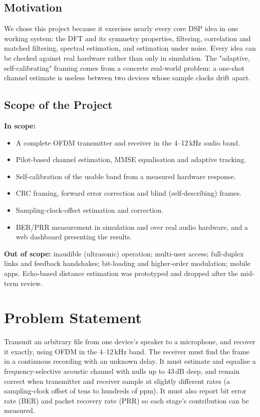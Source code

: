 \documentclass[11pt,a4paper]{report}
\begin{document}
\section{Motivation}
We chose this project because it exercises nearly every core DSP idea in one working
system: the DFT and its symmetry properties, filtering, correlation and matched
filtering, spectral estimation, and estimation under noise. Every idea can be
checked against real hardware rather than only in simulation. The "adaptive,
self-calibrating" framing comes from a concrete real-world problem: a one-shot
channel estimate is useless between two devices whose sample clocks drift apart.

\section{Scope of the Project}
\textbf{In scope:}
\begin{itemize}
    \item A complete OFDM transmitter and receiver in the 4--12\,kHz audio band.
    \item Pilot-based channel estimation, MMSE equalisation and adaptive tracking.
    \item Self-calibration of the usable band from a measured hardware response.
    \item CRC framing, forward error correction and blind (self-describing) frames.
    \item Sampling-clock-offset estimation and correction.
    \item BER/PRR measurement in simulation and over real audio hardware, and a web
    dashboard presenting the results.
\end{itemize}
\textbf{Out of scope:} inaudible (ultrasonic) operation; multi-user access;
full-duplex links and feedback handshakes; bit-loading and higher-order modulation;
mobile apps. Echo-based distance estimation was prototyped and dropped after the
mid-term review.

\chapter{Problem Statement}

Transmit an arbitrary file from one device's speaker to a microphone, and recover it
exactly, using OFDM in the 4--12\,kHz band. The receiver must find the frame in a
continuous recording with an unknown delay. It must estimate and equalise a
frequency-selective acoustic channel with nulls up to 43\,dB deep, and remain
correct when transmitter and receiver sample at slightly different rates (a
sampling-clock offset of tens to hundreds of ppm). It must also report bit error
rate (BER) and packet recovery rate (PRR) so each stage's contribution can be
measured.
\end{document}
